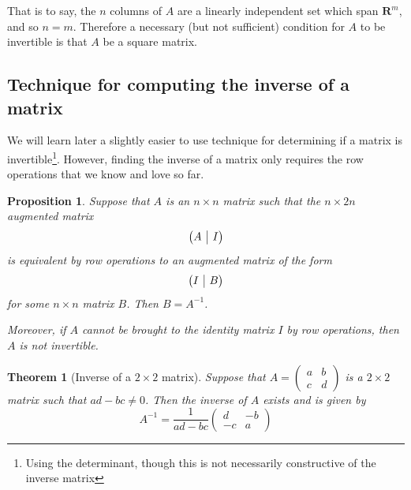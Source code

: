 \documentclass[12pt]{article}
\makeatletter
\numberwithin{equation}{subsection}
\numberwithin{figure}{subsection}
\newtheorem{thm}[subsection]{Theorem}
\newtheorem{prop}[subsection]{Proposition}
\theoremstyle{note}
\newenvironment{amatrix}[1]{%
  \left(\begin{array}{@{}*{#1}{c}|c@{}}
}{%
  \end{array}\right)
}
\makeatother
\begin{document}
That is to say, the $n$ columns of $A$ are a linearly independent set which span $\mathbf{R}^m$, and so $n=m$. Therefore a necessary (but not sufficient) condition for $A$ to be invertible is that $A$ be a square matrix. 

\subsection{Technique for computing the inverse of a matrix}

We will learn later a slightly easier to use technique for determining if a matrix is invertible\footnote{Using the determinant, though this is not necessarily constructive of the inverse matrix}. However, finding the inverse of a matrix only requires the row operations that we know and love so far.  

\begin{prop} \label{prop-compute-inv} Suppose that $A$ is an $n\times n$ matrix such that the $n\times 2n$ augmented matrix  \[ \begin{amatrix}{1} A & I \end{amatrix}\]
is equivalent by row operations to an augmented matrix of the form \[\begin{amatrix}{1} I & B\end{amatrix}\] for some $n\times n$ matrix $B$. Then $B=A^{-1}$. 

Moreover, if $A$ cannot be brought to the identity matrix $I$ by row operations, then $A$ is not invertible. 
\end{prop}


\begin{thm}[Inverse of a $2\times 2$ matrix] \label{thm-2x2-inv}
Suppose that $A=\begin{pmatrix} a & b \\ c & d\end{pmatrix}$ is a $2\times 2$ matrix such that $ad-bc\neq 0$. Then the inverse of $A$ exists and is given by \begin{equation}  \label{eq-inv-of-2x2}
	A^{-1}=\dfrac{1}{ad-bc}\begin{pmatrix} d & -b \\ -c & a \end{pmatrix}
\end{equation}
\end{thm}
\end{document}
